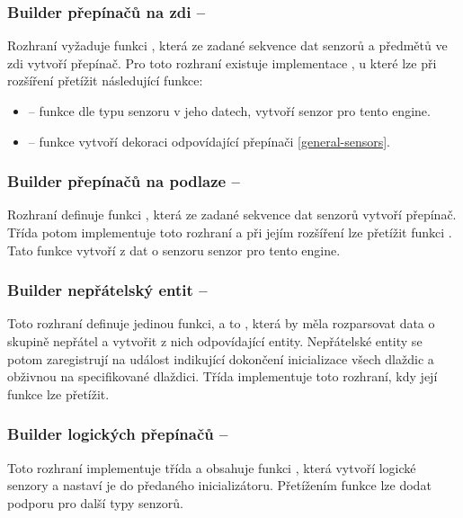 \subsubsection{Builder přepínačů na zdi -- }
Rozhraní  vyžaduje funkci , která ze zadané sekvence dat senzorů a předmětů 
ve zdi vytvoří přepínač. Pro toto rozhraní existuje implementace , u které lze při rozšíření
přetížit následující funkce:
\begin{itemize}
\item {} -- funkce dle typu senzoru v jeho datech, vytvoří senzor pro tento engine.
\item {} -- funkce vytvoří dekoraci odpovídající přepínači \vref{general-sensors}.
\end{itemize}


\subsubsection{Builder přepínačů na podlaze -- }
Rozhraní  definuje funkci , která ze zadané sekvence dat senzorů vytvoří přepínač. Třída 
potom implementuje toto rozhraní a při jejím rozšíření lze přetížit funkci . Tato funkce vytvoří z dat o senzoru
senzor pro tento engine.

\subsubsection{Builder nepřátelský entit -- }
Toto rozhraní definuje jedinou funkci, a to , která by měla rozparsovat data o skupině nepřátel a vytvořit z nich odpovídající entity.
Nepřátelské entity se potom zaregistrují na událost indikující dokončení inicializace všech dlaždic a obživnou na specifikované dlaždici.
Třída  implementuje toto rozhraní, kdy její funkce  lze přetížit.


\subsubsection{Builder logických přepínačů -- }
Toto rozhraní implementuje třída  a obsahuje funkci , která vytvoří logické senzory
a nastaví je do předaného inicializátoru. Přetížením funkce  lze dodat podporu
pro další typy senzorů.


